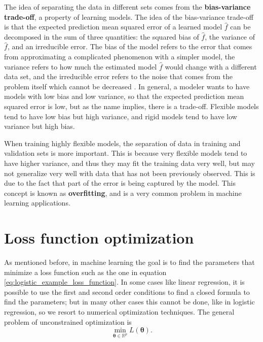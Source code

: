 The idea of separating the data in different sets comes from the \textbf{bias-variance trade-off}, a property of learning models. The idea of the bias-variance trade-off is that the expected prediction mean squared error of a learned model $\hat{f}$ can be decomposed in the sum of three quantities: the squared bias of $\hat{f}$, the variance of $\hat{f}$, and an irreducible error. The bias of the model refers to the error that comes from approximating a complicated phenomenon with a simpler model, the variance refers to how much the estimated model $\hat{f}$ would change with a different data set, and the irreducible error refers to the noise that comes from the problem itself which cannot be decreased \cite{friedman2001elements} \cite{james2013introduction}. In general, a modeler wants to have models with low bias and low variance, so that the expected prediction mean squared error is low, but as the name implies, there is a trade-off. Flexible models tend to have low bias but high variance, and rigid models tend to have low variance but high bias.

When training highly flexible models, the separation of data in training and validation sets is more important. This is because very flexible models tend to have higher variance, and thus they may fit the training data very well, but may not generalize very well with data that has not been previously observed. This is due to the fact that part of the error is being captured by the model. This concept is known as \textbf{overfitting}, and is a very common problem in machine learning applications.




\section{Loss function optimization}

As mentioned before, in machine learning the goal is to find the parameters that minimize a loss function such as the one in equation \eqref{eq:logistic_example_loss_function}. In some cases like linear regression, it is possible to use the first and second order conditions to find a closed formula to find the parameters; but in many other cases this cannot be done, like in logistic regression, so we resort to numerical optimization techniques. The general problem of unconstrained optimization \cite{nocedal2006numerical} is
\begin{equation}
  \min_{\boldsymbol{\theta} \in \mathbb{R}^p} L(\boldsymbol{\theta}).
\end{equation}

